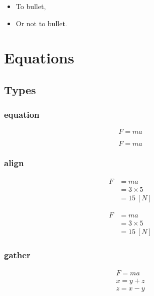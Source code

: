 \begin{itemize}
    \item To bullet,
    \item Or not to bullet.
\end{itemize}


\section{Equations}

\subsection{Types}
\subsubsection{equation}

\begin{TeXlstlisting}
\begin{equation*}
    F = ma
\end{equation*}
\end{TeXlstlisting}

\begin{equation*}
    F = ma
\end{equation*}

\subsubsection{align}

\begin{TeXlstlisting}
\begin{align*}
    F   &= ma \\
        &= 3\times5 \\
        &= 15\ [N]
\end{align*}
\end{TeXlstlisting}

\begin{align*}
    F   &= ma \\
        &= 3\times5 \\
        &= 15\ [N]
\end{align*}

\subsubsection{gather}

\begin{TeXlstlisting}
\begin{gather*}
    F   = ma \\
       x = y+z \\
       z = x-y
\end{gather*}
\end{TeXlstlisting}

